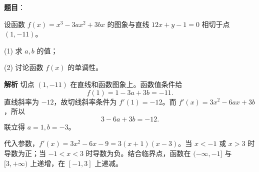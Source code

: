 \begin{answer}

\textbf{题目}：

设函数 \(f(x)=x^3-3ax^2+3bx\) 的图象与直线 \(12x+y-1=0\) 相切于点 \((1,-11)\)。

(1) 求 \(a,b\) 的值；

(2) 讨论函数 \(f(x)\) 的单调性。

\textbf{解析}
切点 \((1,-11)\) 在直线和函数图象上。函数值条件给
\nopagebreak[4]
\[
f(1)=1-3a+3b=-11.
\]
直线斜率为 \(-12\)，故切线斜率条件为 \(f'(1)=-12\)。而 \(f'(x)=3x^2-6ax+3b\)，所以
\nopagebreak[4]
\[
3-6a+3b=-12.
\]
联立得 \(a=1,b=-3\)。

代入参数，\(f'(x)=3x^2-6x-9=3(x+1)(x-3)\)。当 \(x<-1\) 或 \(x>3\) 时导数为正；当 \(-1<x<3\) 时导数为负。结合临界点，函数在 \(( -\infty,-1]\) 与 \([3,+\infty)\) 上递增，在 \([-1,3]\) 上递减。


\gkanswer{答案（2）：递增区间为 ($-$∞,$-$1] 与 [3,+∞)，递减区间为 [$-$1,3]。}

\end{answer}
